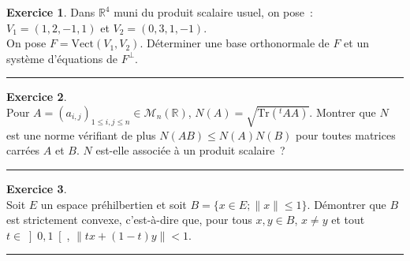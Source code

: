 \documentclass[a4paper,10pt]{article}
\theoremstyle{definition}
\theoremstyle{definition}
\newtheorem{exo}{Exercice}
\newcommand{\R}{\mathbb{R}}
\begin{document}
\begin{minipage}{1\linewidth}
\begin{minipage}[t]{0.48\linewidth}
\begin{exo}
			
			Dans $\R^4$ muni du produit scalaire usuel, on pose~:~$V_1=(1,2,-1,1)$ et $V_2=(0,3,1,-1)$.\\
			On pose $F=\mbox{Vect}(V_1,V_2)$. Déterminer une base orthonormale de $F$ et un système d'équations de $F^\bot$.
			
			\centering
			\rule{1\linewidth}{0.6pt}
		\end{exo}
		
		
		
		\begin{exo}\quad\\[0.25cm]
			Pour $A=(a_{i,j})_{1\leq i,j\leq n}\in\mathcal{M}_n(\R)$, $N(A)=\sqrt{\mbox{Tr}(^tAA)}$. Montrer que $N$ est une norme vérifiant de plus $N(AB)\leq N(A)N(B)$ pour toutes matrices carrées $A$ et $B$. $N$ est-elle associée à un produit scalaire~?			
			
			\centering
			\rule{1\linewidth}{0.6pt}
		\end{exo}
		
		
		\begin{exo}\quad\\[0.25cm]
			Soit $E$ un espace préhilbertien et soit $B=\{x\in E; \|x\| \leq 1\}$. Démontrer que $B$ est strictement convexe, c'est-à-dire que, pour tous $x,y\in B$, $x \neq y$ et tout $t\in \left]0,1\right[ $, $\|tx+(1-t)y\|<1$.
			
			\centering
			\rule{1\linewidth}{0.6pt}
		\end{exo}
		
		
	\end{minipage}
\end{minipage}	
\end{document}
